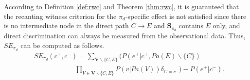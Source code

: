 \documentclass[letterpaper]{article}
\begin{document}
According to Definition \ref{def:rwc} and Theorem \ref{thm:rwc}, it is guaranteed that the recanting witness criterion for the $\pi_{d}$-specific effect is not satisfied since there is no intermediate node in the direct path $C\rightarrow E$ and $\mathbf{S}_{\pi_{d}}$ contains $E$ only, and direct discrimination can always be measured from the observational data. Thus, $SE_{\pi_{d}}$ can be computed as follows. %
\begin{equation}\label{eq:sed}
\begin{split}
& SE_{\pi_{d}}(c^{+},c^{-}) = \!\!\! \sum_{\mathbf{V}\backslash\{C,E\}} \bigg(  P(e^{+}|c^{+},Pa(E)\backslash{\{C\}}) \\
& \quad\quad\quad\quad\quad\quad \prod_{V\in \mathbf{V}\backslash\{C,E\}} P(v|Pa(V))\delta_{C=c^{-}} \bigg) - P(e^{+}|c^{-}).
\end{split}
\end{equation}
\end{document}
